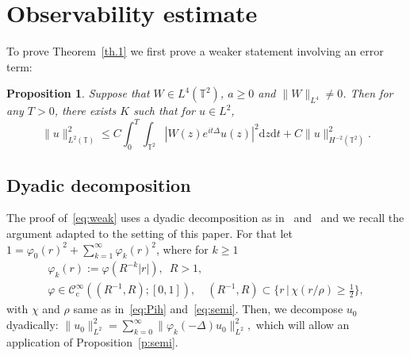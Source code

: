 \documentclass[11pt]{article}
\newtheorem{prop}[theo]{Proposition}
\theoremstyle{definition}
\numberwithin{equation}{section}
\numberwithin{figure}{section}
\numberwithin{table}{section}
\newcommand{\CIc}{{\mathcal C}^\infty_{\mathrm{c}} }
\newcommand{\TT}{{\mathbb T}}
\newcommand*{\dd}{\mathrm{d}}
\newcommand*{\dz}{\dd z}
\newcommand*{\dt}{\dd t}
\newcommand*{\tq}{\,|\,}
\begin{document}
\section{Observability estimate}\label{obs}

To prove Theorem~\ref{th.1} we first prove a weaker statement involving an error term:

\begin{prop}\label{p:weak}
Suppose that $ W \in L^4 (\TT^2) $, $ a \geq 0 $ and $ \| W \|_{ L^4 } \neq 0 $. Then for any $ T > 0 $, there exists $ K $ such that for $ u \in L^2 $,
\begin{equation}\label{eq:weak}
\| u \|_{ L^2 (\TT) }^2 \leq C \int_0^T \int_{\TT^2 } | W(z) e^{ i t \Delta } u (z) |^2 \dz \dt + C \| u \|^2_{ H^{-2} (\TT^2) }.
\end{equation}
\end{prop}

\subsection{Dyadic decomposition}\label{dya}
The proof of~\eqref{eq:weak} uses a dyadic decomposition as in~\cite[Section~5.1]{BBZ} and~\cite[Section~4]{BZ4} and we recall the argument adapted to the setting of this paper. For that let $ 1= \varphi_{0} (r)^2 + \sum_{k=1}^{\infty} \varphi_{k} (r)^2$, where for $ k \geq 1 $
\begin{gather*}
\varphi_{k} (r) := \varphi(R ^{-k} |r|), \enspace R > 1, \\ \varphi \in \CIc ((R^{-1}, R) ; [0, 1]), \quad (R^{-1}, R) \subset \{ r \tq \chi(r / \rho) \geq
\textstyle{\frac12} \},
\end{gather*}
with $ \chi $ and $ \rho $ same as in~\eqref{eq:Pih} and~\eqref{eq:semi}. Then, we decompose $u_0$ dyadically: $\|u_0 \|^2_{L^2} = \sum_{k=0}^\infty \|\varphi_{k}(- \Delta) u_0 \|_{L^2}^2, $ which will allow an application of Proposition~\ref{p:semi}.
\end{document}
